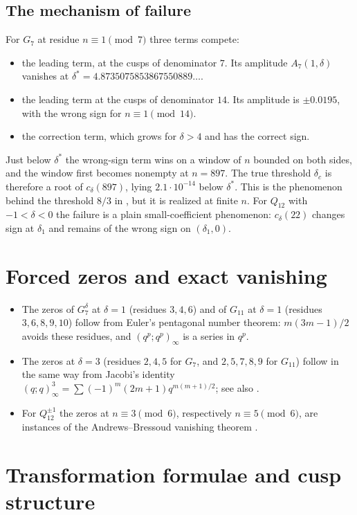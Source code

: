 \documentclass[11pt]{amsart}
\theoremstyle{remark}
\begin{document}
\subsection*{The mechanism of failure}
For $G_7$ at residue $n\equiv1\pmod7$ three terms compete:
\begin{itemize}[leftmargin=2em]
\item the leading term, at the cusps of denominator $7$. Its amplitude $A_7(1,\delta)$ vanishes at $\delta^*=4.8735075853867550889\ldots$.
\item the leading term at the cusps of denominator $14$. Its amplitude is $\pm0.0195$, with the wrong sign for $n\equiv1\pmod{14}$.
\item the correction term, which grows for $\delta>4$ and has the correct sign.
\end{itemize}
Just below $\delta^*$ the wrong-sign term wins on a window of $n$ bounded on both sides, and the window first becomes nonempty at $n=897$. The true threshold $\delta_c$ is therefore a root of $c_\delta(897)$, lying $2.1\cdot10^{-14}$ below $\delta^*$. This is the phenomenon behind the threshold $8/3$ in \cite{P1}, but it is realized at finite $n$. For $Q_{12}$ with $-1<\delta<0$ the failure is a plain small-coefficient phenomenon: $c_\delta(22)$ changes sign at $\delta_1$ and remains of the wrong sign on $(\delta_1,0)$.

\section{Forced zeros and exact vanishing}\label{sec:zeros}
\begin{itemize}[leftmargin=2em]
\item The zeros of $G_7^\delta$ at $\delta=1$ (residues $3,4,6$) and of $G_{11}$ at $\delta=1$ (residues $3,6,8,9,10$) follow from Euler's pentagonal number theorem: $m(3m-1)/2$ avoids these residues, and $(q^p;q^p)_\infty$ is a series in $q^p$.
\item The zeros at $\delta=3$ (residues $2,4,5$ for $G_7$, and $2,5,7,8,9$ for $G_{11}$) follow in the same way from Jacobi's identity $(q;q)_\infty^3=\sum(-1)^m(2m+1)q^{m(m+1)/2}$; see also \cite[Cor.~13]{SZ}.
\item For $Q_{12}^{\pm1}$ the zeros at $n\equiv3\pmod6$, respectively $n\equiv5\pmod6$, are instances of the Andrews--Bressoud vanishing theorem \cite{AB}.
\end{itemize}

\section{Transformation formulae and cusp structure}
\end{document}
